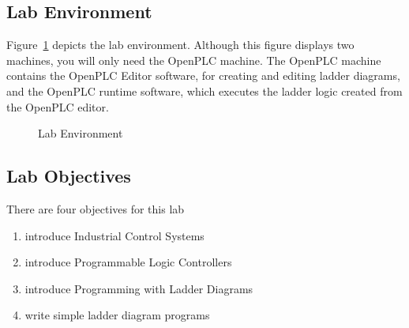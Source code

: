 \subsection{Lab Environment} 
Figure~\ref{fig:labsetup} depicts the lab environment. Although this figure displays two machines, you will only need the OpenPLC machine. The OpenPLC machine contains the OpenPLC Editor software, for creating and editing ladder diagrams, and the OpenPLC runtime software, which executes the ladder logic created from the OpenPLC editor.

\begin{figure}[!htb]
\begin{center}
\end{center}
\caption{Lab Environment}
\label{fig:labsetup}
\end{figure}



\subsection{Lab Objectives}
There are four objectives for this lab 
\begin{enumerate} [noitemsep]
\item introduce Industrial Control Systems
\item introduce Programmable Logic Controllers
\item introduce Programming with Ladder Diagrams
\item write simple ladder diagram programs
\end{enumerate}